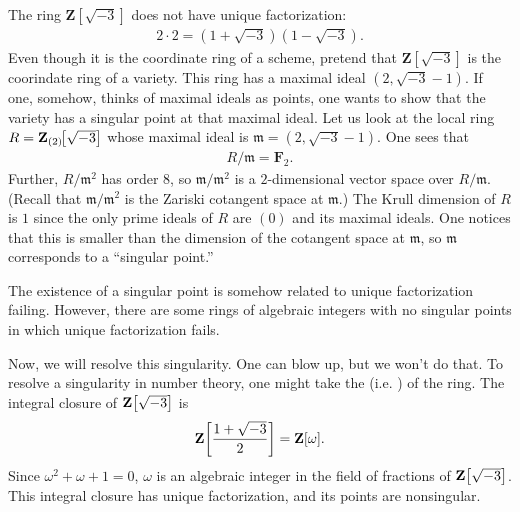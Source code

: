 \documentclass [11 pt, oneside, margin = 1 in] {article}
\begin{document}
\begin{example}[ ]\label{}\text{}
The ring $\mathbf{Z}\!\left[\sqrt{-3}\right]$ does not have unique factorization:
\begin{align*}
	2\cdot 2 = (1+\sqrt{-3} ) (1-\sqrt{-3} ).
\end{align*}
Even though it is the coordinate ring of a scheme, pretend that $\mathbf{Z}\!\left[\sqrt{-3}\right]$ is the coorindate ring of a variety. This ring has a maximal ideal $(2,\sqrt{-3}-1 )$. If one, somehow, thinks of maximal ideals as points, one wants to show that the variety has a singular point at that maximal ideal. Let us look at the local ring $R=\mathbf Z_{(2)} \!\!\left[ \sqrt{-3}  \right] $ whose maximal ideal is $\mathfrak{m}=(2,\sqrt{-3}-1 )$. One sees that \begin{align*}
	R/\mathfrak{m} = \mathbf{F}_{2}.
\end{align*}
Further, $R/\mathfrak{m}^2$ has order $8$, so $\mathfrak{m}/\mathfrak{m}^2$ is a $2$-dimensional vector space over $R/\mathfrak{m}$. (Recall that $\mathfrak{m}/\mathfrak{m}^2$ is the Zariski cotangent space at $\mathfrak{m}$.) The Krull dimension of $R$ is $1$ since the only prime ideals of $R$ are $(0)$ and its maximal ideals. One notices that this is smaller than the dimension of the cotangent space at $\mathfrak{m}$, so $\mathfrak{m}$ corresponds to a ``singular point.''

\begin{remark}
	The existence of a singular point is somehow related to unique factorization failing. However, there are some rings of algebraic integers with no singular points in which unique factorization fails. 
\end{remark}

Now, we will resolve this singularity. One can blow up, but we won't do that. To resolve a singularity in number theory, one might take the  (i.e. ) of the ring. The integral closure of $\mathbf Z\!\left[ \sqrt{-3}  \right] $ is
\begin{align*}
	\mathbf Z \!\left[ \frac{1+\sqrt{-3} }{2} \right] = \mathbf Z[\omega] .
\end{align*}
Since $\omega^2+\omega+1=0$, $\omega$ is an algebraic integer in the field of fractions of $\mathbf Z\!\left[ \sqrt{-3}  \right] $. This integral closure has unique factorization, and its points are nonsingular.
\end{example}
\end{document}
